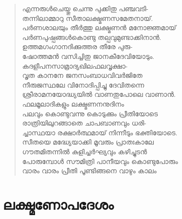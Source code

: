 \begin{verse}
എന്നരുള്‍ചെയ്തു ചെന്നു പുക്കിതു പഞ്ചവടി-\\
തന്നിലാമ്മാറു സീതാലക്ഷ്മണസമേതനായ്.\\
പര്‍ണശാലയും തീര്‍ത്തു ലക്ഷ്മണന്‍ മനോജ്ഞമായ്\\
പര്‍ണപുഷ്പങ്ങള്‍കൊണ്ടു തല്പവുമുണ്ടാക്കിനാന്‍.\\
ഉത്തമഗംഗാനദിക്കുത്തര തീരേ പുരു-\\
ഷോത്തമന്‍ വസിച്ചിതു ജാനകീദേവിയോടും.\\
കദളീപനസാമ്രാദ്യഖിലഫലവൃക്ഷാ-\\
വൃത കാനനേ ജനസംബാധവിവര്‍ജിതേ\\
നീരുജസ്ഥലേ വിനോദിപ്പിച്ചു ദേവിതന്നെ\\
ശ്രീരാമനയോദ്ധ്യയില്‍ വാണതുപോലെ വാണാന്‍.\\
ഫലമൂലാദികളും ലക്ഷ്മണനനുദിനം\\
പലവും കൊണ്ടുവന്നു കൊടുക്കും പ്രീതിയോടെ\\
രാത്രിയിലുറങ്ങാതെ ചാപബാണവും ധരി-\\
ച്ചാസ്ഥയാ രക്ഷാര്‍ത്ഥമായ് നിന്നീടും ഭക്തിയോടെ.\\
സീതയെ മദ്ധ്യേയാക്കി മൂവരും പ്രാതഃകാലേ\\
ഗൗതമിതന്നില്‍ കുളിച്ചര്‍ഘ്യവും കഴിച്ചുടന്‍\\
പോരുമ്പോള്‍ സൗമിത്രി പാനീയവും കൊണ്ടുപോരും\\
വാരം വാരം പ്രീതി പൂണ്ടിങ്ങനെ വാഴും കാലം
\end{verse}

\section{ലക്ഷ്മണോപദേശം}

